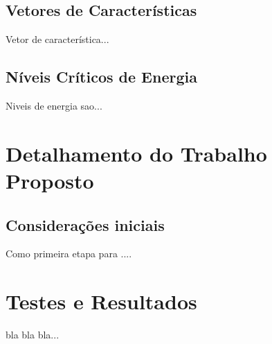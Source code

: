 \documentclass[a4paper,12pt,twoside,openright]{report}
\begin{document}
\section{Vetores de Caracter\'{i}sticas}
\label{vetores de caracterisctica}
\par Vetor de caracter\'{i}stica...

\section{N\'{i}veis Cr\'{i}ticos de Energia}
\label{niveis criticos de energia}
\par Niveis de energia sao...

\chapter{Detalhamento do Trabalho Proposto}
\label{cap3}
\thispagestyle{myheadings}
\vspace*{-0.3cm}
\section{Considera\c{c}\~{o}es iniciais}
\par Como primeira etapa para ....
\chapter{Testes e Resultados}
\label{cap4}
\thispagestyle{myheadings}
bla bla bla...
\end{document}
